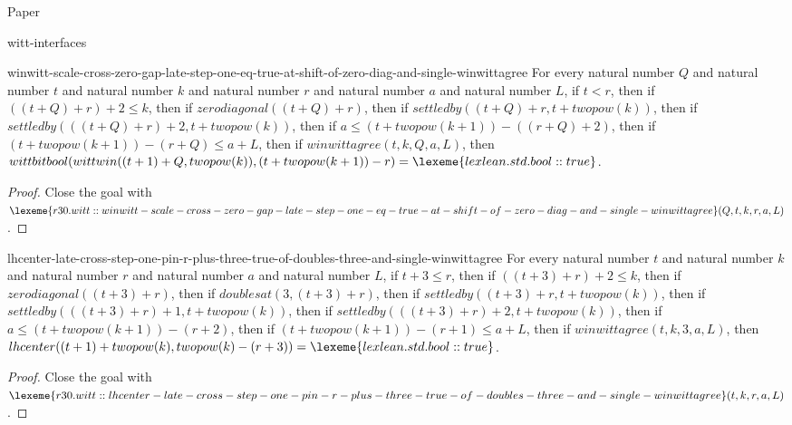 \begin{lexlean}{Paper}
\begin{section}{witt-interfaces}
  \begin{theorem}{winwitt-scale-cross-zero-gap-late-step-one-eq-true-at-shift-of-zero-diag-and-single-winwittagree}
  For every natural number \(Q\) and natural number \(t\) and natural number \(k\) and natural number \(r\) and natural number \(a\) and natural number \(L\), if \(t < r\), then if \(((t + Q) + r) + 2 ≤ k\), then if \(zerodiagonal((t + Q) + r)\), then if \(settledby((t + Q) + r, t + twopow(k))\), then if \(settledby(((t + Q) + r) + 2, t + twopow(k))\), then if \(a ≤ (t + twopow(k + 1)) - ((r + Q) + 2)\), then if \((t + twopow(k + 1)) - (r + Q) ≤ a + L\), then if \(winwittagree(t, k, Q, a, L)\), then \(wittbitbool(wittwin((t + 1) + Q, twopow(k)), (t + twopow(k + 1)) - r) = \lexeme{lexlean.std.bool::true}\).
  \begin{proof}
  Close the goal with \(\lexeme{r30.witt::winwitt-scale-cross-zero-gap-late-step-one-eq-true-at-shift-of-zero-diag-and-single-winwittagree}(Q, t, k, r, a, L)\).
  \end{proof}
  \end{theorem}

  \begin{theorem}{lhcenter-late-cross-step-one-pin-r-plus-three-true-of-doubles-three-and-single-winwittagree}
  For every natural number \(t\) and natural number \(k\) and natural number \(r\) and natural number \(a\) and natural number \(L\), if \(t + 3 ≤ r\), then if \(((t + 3) + r) + 2 ≤ k\), then if \(zerodiagonal((t + 3) + r)\), then if \(doublesat(3, (t + 3) + r)\), then if \(settledby((t + 3) + r, t + twopow(k))\), then if \(settledby(((t + 3) + r) + 1, t + twopow(k))\), then if \(settledby(((t + 3) + r) + 2, t + twopow(k))\), then if \(a ≤ (t + twopow(k + 1)) - (r + 2)\), then if \((t + twopow(k + 1)) - (r + 1) ≤ a + L\), then if \(winwittagree(t, k, 3, a, L)\), then \(lhcenter((t + 1) + twopow(k), twopow(k) - (r + 3)) = \lexeme{lexlean.std.bool::true}\).
  \begin{proof}
  Close the goal with \(\lexeme{r30.witt::lhcenter-late-cross-step-one-pin-r-plus-three-true-of-doubles-three-and-single-winwittagree}(t, k, r, a, L)\).
  \end{proof}
  \end{theorem}


\end{section}
\end{lexlean}
